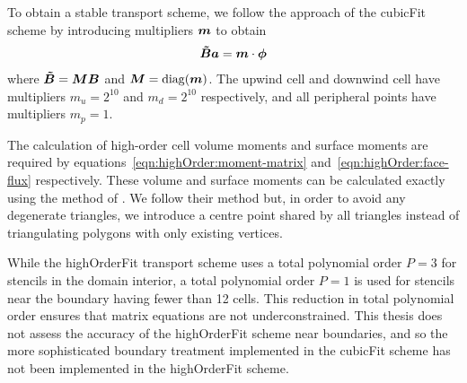 To obtain a stable transport scheme, we follow the approach of the cubicFit scheme by introducing multipliers $\bm{m}$ to obtain
\begin{align}
	\bm{\tilde{B}} \bm{a} = \bm{m} \cdot \bm{\phi}
\end{align}
where $\bm{\tilde{B}} = \bm{M} \bm{B}$ and $\bm{M} = \mathrm{diag}(\bm{m})$.
The upwind cell and downwind cell have multipliers $m_u = 2^{10}$ and $m_d = 2^{10}$ respectively, and all peripheral points have multipliers $m_p = 1$.

The calculation of high-order cell volume moments and surface moments are required by equations~\eqref{eqn:highOrder:moment-matrix} and~\eqref{eqn:highOrder:face-flux} respectively.  These volume and surface moments can be calculated exactly using the method of \citet{tuzikov2003}.
We follow their method but, in order to avoid any degenerate triangles, we introduce a centre point shared by all triangles instead of triangulating polygons with only existing vertices.

While the highOrderFit transport scheme uses a total polynomial order $P = 3$ for stencils in the domain interior, a total polynomial order $P = 1$ is used for stencils near the boundary having fewer than 12 cells.
This reduction in total polynomial order ensures that matrix equations are not underconstrained.
This thesis does not assess the accuracy of the highOrderFit scheme near boundaries, and so the more sophisticated boundary treatment implemented in the cubicFit scheme has not been implemented in the highOrderFit scheme.

